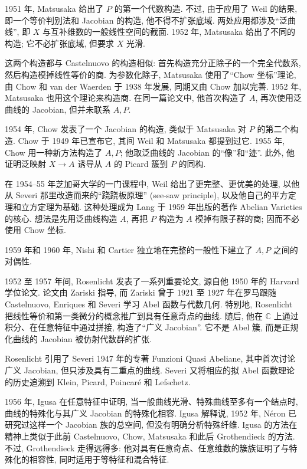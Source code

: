 1951 年, Matsusaka 给出了 $P$ 的第一个代数构造. 不过, 由于应用了 Weil 的结果, 即一个等价判别法和 Jacobian 的构造, 他不得不扩张底域. 两处应用都涉及“泛曲线”, 即 $X$ 与互补维数的一般线性空间的截面. 1952 年, Matsusaka 给出了不同的构造; 它不必扩张底域, 但要求 $X$ 光滑.

这两个构造都与 Castelnuovo 的构造相似: 首先构造充分正除子的一个完全代数系, 然后构造模掉线性等价的商. 为参数化除子, Matsusaka 使用了“Chow 坐标”理论, 由 Chow 和 van der Waerden 于 1938 年发展, 同期又由 Chow 加以完善. 1952 年, Matsusaka 也用这个理论来构造商. 在同一篇论文中, 他首次构造了 $A$, 再次使用泛曲线的 Jacobian, 但并未联系 $A,P$.

1954 年, Chow 发表了一个 Jacobian 的构造, 类似于 Matsusaka 对 $P$ 的第二个构造. Chow 于 1949 年已宣布它, 其间 Weil 和 Matsusaka 都提到过它. 1955 年, Chow 用一种新方法构造了 $A,P$; 他取泛曲线的 Jacobian 的“像”和“迹”. 此外, 他证明泛映射 $X\to A$ 诱导从 $A$ 的 Picard 簇到 $P$ 的同构.

在 1954--55 年芝加哥大学的一门课程中, Weil 给出了更完整、更优美的处理, 以他从 Severi 那里改造而来的“跷跷板原理” (see-saw principle), 以及他自己的平方定理和立方定理为基础. 这种处理成为 Lang 于 1959 年出版的著作 Abelian Varieties 的核心. 想法是先用泛曲线构造 $A$, 再把 $P$ 构造为 $A$ 模掉有限子群的商; 因而不必使用 Chow 坐标.

1959 年和 1960 年, Nishi 和 Cartier 独立地在完整的一般性下建立了 $A,P$ 之间的对偶性.

1952 至 1957 年间, Rosenlicht 发表了一系列重要论文, 源自他 1950 年的 Harvard 学位论文. 论文由 Zariski 指导, 而 Zariski 曾于 1921 至 1927 年在罗马跟随 Castelnuovo, Enriques 和 Severi 学习 Abel 函数与代数几何. 特别地, Rosenlicht 把线性等价和第一类微分的概念推广到具有任意奇点的曲线. 随后, 他在 $\mathbb C$ 上通过积分、在任意特征中通过拼接, 构造了“广义 Jacobian”. 它不是 Abel 簇, 而是正规化曲线的 Jacobian 被仿射代数群的扩张.

Rosenlicht 引用了 Severi 1947 年的专著 Funzioni Quasi Abeliane, 其中首次讨论广义 Jacobian, 但只涉及具有二重点的曲线. Severi 又将相应的拟 Abel 函数理论的历史追溯到 Klein, Picard, Poincaré 和 Lefschetz.

1956 年, Igusa 在任意特征中证明, 当一般曲线光滑、特殊曲线至多有一个结点时, 曲线的特殊化与其广义 Jacobian 的特殊化相容. Igusa 解释说, 1952 年, Néron 已研究过这样一个 Jacobian 族的总空间, 但没有明确分析特殊纤维. Igusa 的方法在精神上类似于此前 Castelnuovo, Chow, Matsusaka 和此后 Grothendieck 的方法. 不过, Grothendieck 走得远得多: 他对具有任意奇点、任意维数的簇族证明了与特殊化的相容性, 同时适用于等特征和混合特征.

